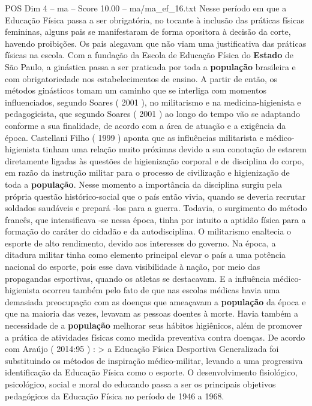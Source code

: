 \begin{textsample}{POS Dim 4 – ma – Score 10.00 – ma/ma\_ef\_16.txt}
Nesse período em que a Educação Física passa a ser obrigatória, no tocante à inclusão das práticas físicas femininas, alguns pais se manifestaram de forma opositora à decisão da corte, havendo proibições.
Os pais alegavam que não viam uma justificativa das práticas físicas na escola.
Com a fundação da Escola de Educação Física do \textbf{Estado} de São Paulo, a ginástica passa a ser praticada por toda a \textbf{população} brasileira e com obrigatoriedade nos estabelecimentos de ensino.
A partir de então, os métodos ginásticos tomam um caminho que se interliga com momentos influenciados, segundo Soares ( 2001 ), no militarismo e na medicina-higienista e pedagogicista, que segundo Soares ( 2001 ) ao longo do tempo vão se adaptando conforme a sua finalidade, de acordo com a área de atuação e a exigência da época.
Castellani Filho ( 1999 ) aponta que as influências militarista e médico-higienista tinham uma relação muito próximas devido a sua conotação de estarem diretamente ligadas às questões de higienização corporal e de disciplina do corpo, em razão da instrução militar para o processo de civilização e higienização de toda a \textbf{população}.
Nesse momento a importância da disciplina surgiu pela própria questão histórico-social que o país então vivia, quando se deveria recrutar soldados saudáveis e prepará -los para a guerra.
Todavia, o surgimento do método francês, que intensificava -se nessa época, tinha por intuito a aptidão física para a formação do caráter do cidadão e da autodisciplina.
O militarismo enaltecia o esporte de alto rendimento, devido aos interesses do governo.
Na época, a ditadura militar tinha como elemento principal elevar o país a uma potência nacional do esporte, pois esse dava visibilidade à nação, por meio das propagandas esportivas, quando os atletas se destacavam.
E a influência médico-higienista ocorreu também pelo fato de que nas escolas médicas havia uma demasiada preocupação com as doenças que ameaçavam a \textbf{população} da época e que na maioria das vezes, levavam as pessoas doentes à morte.
Havia também a necessidade de a \textbf{população} melhorar seus hábitos higiênicos, além de promover a prática de atividades físicas como medida preventiva contra doenças.
De acordo com Araújo ( 2014:95 ) : > a Educação Física Desportiva Generalizada foi substituindo os métodos de inspiração médico-militar, levando a uma progressiva identificação da Educação Física como o esporte.
O desenvolvimento fisiológico, psicológico, social e moral do educando passa a ser os principais objetivos pedagógicos da Educação Física no período de 1946 a 1968.

\end{textsample}
